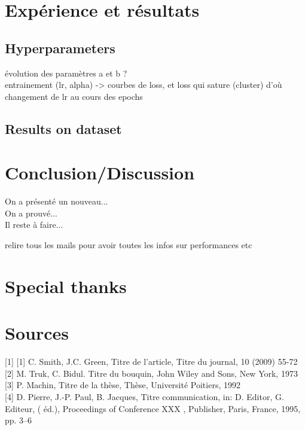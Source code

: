 \documentclass{article}
\begin{document}
\section{Expérience et résultats}
    \subsection{Hyperparameters}
    évolution des paramètres a et b ?\\
    entrainement (lr, alpha) -> courbes de loss, et loss qui sature (cluster) d'où changement de lr au cours des epochs
    \subsection{Results on dataset}












\section{Conclusion/Discussion}
On a présenté un nouveau...\\
On a prouvé...\\
Il reste à faire...

relire tous les mails pour avoir toutes les infos sur performances etc

\section*{Special thanks}

\section*{Sources}

\noindent
{[}1]
{[}1] C. Smith, J.C. Green, Titre de l’article, Titre du journal, 10 (2009) 55-72\\
{[}2] M. Truk, C. Bidul. Titre du bouquin, John Wiley and Sons, New York, 1973\\
{[}3] P. Machin, Titre de la thèse, Thèse, Université Poitiers, 1992\\
{[}4] D. Pierre, J.-P. Paul, B. Jacques, Titre communication, in: D. Editor, G. Editeur, ( éd.), Proceedings of Conference XXX , Publisher, Paris, France, 1995, pp. 3–6

\newpage
\end{document}
